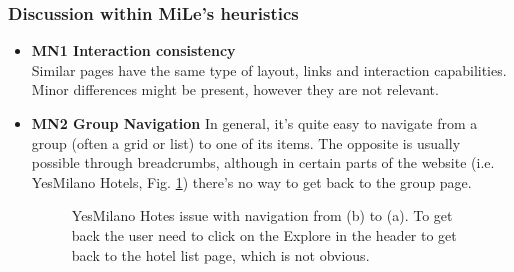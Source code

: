 \subsubsection{Discussion within MiLe's heuristics}
\begin{itemize}
    \item \textbf{MN1 Interaction consistency}\\
    Similar pages have the same type of layout, links and interaction capabilities. Minor differences might be present, however they are not relevant.

    \item \textbf{MN2 Group Navigation}
    In general, it's quite easy to navigate from a group (often a grid or list) to one of its items. The opposite is usually possible through breadcrumbs, although in certain parts of the website (i.e. YesMilano Hotels, Fig. \ref{fig:MN2-1}) there's no way to get back to the group page.

    \begin{figure}[!ht]
        \centering
        \qquad
        \caption{YesMilano Hotes issue with navigation from (b) to (a). To get back the user need to click on the Explore in the header to get back to the hotel list page, which is not obvious.}%
        \label{fig:MN2-1}%
    \end{figure}


\end{itemize}
